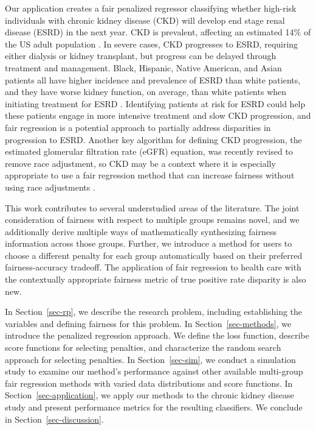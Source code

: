 \documentclass[
  12pt]{article}
\begin{document}
Our application creates a fair penalized regressor classifying whether
high-risk individuals with chronic kidney disease (CKD) will develop end
stage renal disease (ESRD) in the next year. CKD is prevalent, affecting
an estimated 14\% of the US adult population \citep{cdc_chronic_2025}.
In severe cases, CKD progresses to ESRD, requiring either dialysis or
kidney transplant, but progress can be delayed through treatment and
management. Black, Hispanic, Native American, and Asian patients all
have higher incidence and prevalence of ESRD than white patients, and
they have worse kidney function, on average, than white patients when
initiating treatment for ESRD \citep{johansen_us_2025}. Identifying
patients at risk for ESRD could help these patients engage in more
intensive treatment and slow CKD progression, and fair regression is a
potential approach to partially address disparities in progression to
ESRD. Another key algorithm for defining CKD progression, the estimated
glomerular filtration rate (eGFR) equation, was recently revised to
remove race adjustment, so CKD may be a context where it is especially
appropriate to use a fair regression method that can increase fairness
without using race adjustments \citep{cusick_algorithmic_2024}.

This work contributes to several understudied areas of the literature.
The joint consideration of fairness with respect to multiple groups
remains novel, and we additionally derive multiple ways of
mathematically synthesizing fairness information across those groups.
Further, we introduce a method for users to choose a different penalty
for each group automatically based on their preferred fairness-accuracy
tradeoff. The application of fair regression to health care with the
contextually appropriate fairness metric of true positive rate disparity
is also new.

In Section~\ref{sec-rp}, we describe the research problem, including
establishing the variables and defining fairness for this problem. In
Section~\ref{sec-methods}, we introduce the penalized regression
approach. We define the loss function, describe score functions for
selecting penalties, and characterize the random search approach for
selecting penalties. In Section~\ref{sec-sim}, we conduct a simulation
study to examine our method's performance against other available
multi-group fair regression methods with varied data distributions and
score functions. In Section~\ref{sec-application}, we apply our methods
to the chronic kidney disease study and present performance metrics for
the resulting classifiers. We conclude in Section~\ref{sec-discussion}.
\end{document}
